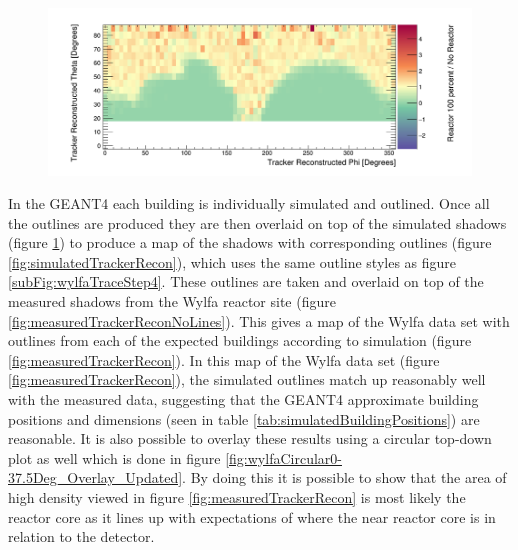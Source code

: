 \begin{figure}[!h]
 \centering
 \includegraphics[width=\linewidth]{Chapter5/Figs/wylfaRasterNew/simulatedTrackerReconNoLines.png}
 \label{fig:simulatedTrackerReconNoLines}
\end{figure}

In the GEANT4 each building is individually simulated and outlined. Once all the outlines are produced they are then overlaid on top of the simulated shadows (figure \ref{fig:simulatedTrackerReconNoLines}) to produce a map of the shadows with corresponding outlines (figure \ref{fig:simulatedTrackerRecon}), which uses the same outline styles as figure \ref{subFig:wylfaTraceStep4}. These outlines are taken and overlaid on top of the measured shadows from the Wylfa reactor site (figure \ref{fig:measuredTrackerReconNoLines}). This gives a map of the Wylfa data set with outlines from each of the expected buildings according to simulation (figure \ref{fig:measuredTrackerRecon}). In this map of the Wylfa data set (figure \ref{fig:measuredTrackerRecon}), the simulated outlines match up reasonably well with the measured data, suggesting that the GEANT4 approximate building positions and dimensions (seen in table \ref{tab:simulatedBuildingPositions}) are reasonable. It is also possible to overlay these results using a circular top-down plot as well which is done in figure \ref{fig:wylfaCircular0-37.5Deg_Overlay_Updated}. By doing this it is possible to show that the area of high density viewed in figure \ref{fig:measuredTrackerRecon} is most likely the reactor core as it lines up with expectations of where the near reactor core is in relation to the detector. 

